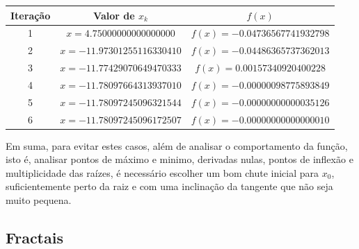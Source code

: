 \begin{center}
\small
\begin{tabular}{|c|c|c|}
\hline
Iteração & Valor de $x_k$ & $f(x)$ \\
\hline
1 & $x = 4.75000000000000000$ & $f(x) = -0.04736567741932798$ \\
\hline
2 & $x = -11.97301255116330410$ & $f(x) = -0.04486365737362013$ \\
\hline
3 & $x = -11.77429070649470333$ & $f(x) = 0.00157340920400228$ \\
\hline
4 & $x = -11.78097664313937010$ & $f(x) = -0.00000098775893849$ \\
\hline
5 & $x = -11.78097245096321544$ & $f(x) = -0.00000000000035126$ \\
\hline
6 & $x = -11.78097245096172507$ & $f(x) = -0.00000000000000010$ \\
\hline
\end{tabular}
\label{tab:ciladaNR}
\end{center}

Em suma, para evitar estes casos, além de analisar o comportamento da função, isto é, analisar pontos de máximo e minimo, derivadas nulas, pontos de inflexão e multiplicidade das raízes, é necessário escolher um bom chute inicial para $x_0$, suficientemente perto da raiz e com uma inclinação da tangente que não seja muito pequena.

\subsection{Fractais}